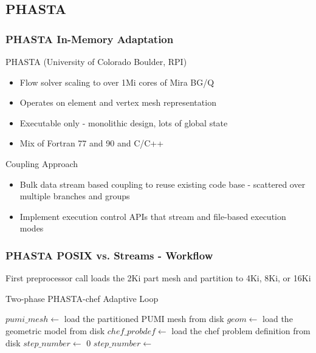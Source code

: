 \documentclass{beamer}
\begin{document}
\subsection{PHASTA}

\begin{frame}
  \frametitle{PHASTA In-Memory Adaptation}
  PHASTA (University of Colorado Boulder, RPI)
  \begin{itemize}
    \item Flow solver scaling to over 1Mi cores of Mira BG/Q
    \item Operates on element and vertex mesh representation
    \item Executable only - monolithic design, lots of global state
    \item Mix of Fortran 77 and 90 and C/C++
  \end{itemize}
  Coupling Approach
  \begin{itemize}
    \item Bulk data stream based coupling to reuse existing code base -
      scattered over multiple branches and groups
    \item Implement execution control APIs that stream and file-based
      execution modes
  \end{itemize}
\end{frame}

\begin{frame}
  \frametitle{PHASTA POSIX vs. Streams - Workflow}
  First preprocessor call loads the 2Ki part mesh and partition to 4Ki, 8Ki, or 16Ki\\
  \begin{algorithm}[H]
    \caption{Two-phase PHASTA-chef Adaptive Loop}\label{alg:twophase}
    \small
    \begin{algorithmic}[1]
        \State $pumi\_mesh \gets$ load the partitioned PUMI mesh
               from disk\label{step:loadmesh}
        \State $geom \gets$ load the geometric model from
               disk\label{step:loadgeom}
        \State $chef\_probdef \gets$ load the chef problem definition
               from disk\label{step:loadprobdef}
        \State {}
        \State $step\_number \gets$ 0
          \State $step\_number \gets$ 
          \State {}
          \State {}
          \State {}
        \EndWhile
      \EndProcedure
    \end{algorithmic}
  \end{algorithm}
\end{frame}
\end{document}
